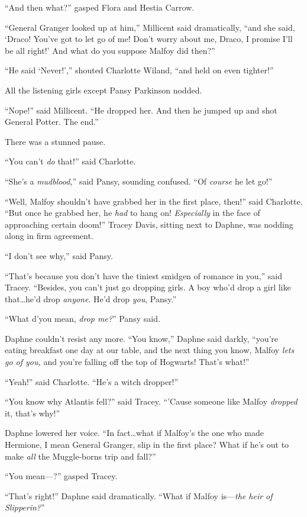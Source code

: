 “And then what?” gasped Flora and Hestia Carrow.

“General Granger looked up at him,” Millicent said dramatically, “and she said, ‘Draco! You’ve got to let go of me! Don’t worry about me, Draco, I promise I’ll be all right!’ And what do you suppose Malfoy did then?”

“He said ‘Never!’,” shouted Charlotte Wiland, “and held on even tighter!”

All the listening girls except Pansy Parkinson nodded.

“Nope!” said Millicent. “He dropped her. And then he jumped up and shot General Potter. The end.”

There was a stunned pause.

“You can’t \emph{do} that!” said Charlotte.

“She’s a \emph{mudblood,}” said Pansy, sounding confused. “Of \emph{course} he let go!”

“Well, Malfoy shouldn’t have grabbed her in the first place, then!” said Charlotte. “But once he grabbed her, he \emph{had} to hang on! \emph{Especially} in the face of approaching certain doom!” Tracey Davis, sitting next to Daphne, was nodding along in firm agreement.

“I don’t see why,” said Pansy.

“That’s because you don’t have the tiniest smidgen of romance in you,” said Tracey. “Besides, you can’t just go dropping girls. A boy who’d drop a girl like that…he’d drop \emph{anyone}. He’d drop \emph{you}, Pansy.”

“What d’you mean, \emph{drop me?}” Pansy said.

Daphne couldn’t resist any more. “You know,” Daphne said darkly, “you’re eating breakfast one day at our table, and the next thing you know, Malfoy \emph{lets go of you,} and you’re falling off the top of Hogwarts! That’s what!”

“Yeah!” said Charlotte. “He’s a witch dropper!”

“You know why Atlantis fell?” said Tracey. “’Cause someone like Malfoy \emph{dropped} it, that’s why!”

Daphne lowered her voice. “In fact…what if Malfoy’s the one who made Hermione, I mean General Granger, slip in the first place? What if he’s out to make \emph{all} the Muggle-borns trip and fall?”

“You mean—?” gasped Tracey.

“That’s right!” Daphne said dramatically. “What if Malfoy is—\emph{the heir of Slipperin?}”

